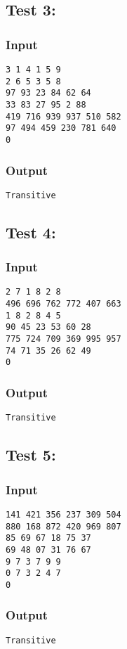 \documentclass[twocolumn]{extarticle}
\begin{document}
\subsection*{Test 3:}
\subsubsection*{Input}
\texttt{3 1 4 1 5 9\\
2 6 5 3 5 8\\
97 93 23 84 62 64\\
33 83 27 95 2 88\\
419 716 939 937 510 582\\
97 494 459 230 781 640\\
0}
 
\subsubsection*{Output}
\texttt{Transitive}
 
\subsection*{Test 4:}
\subsubsection*{Input}
\texttt{2 7 1 8 2 8\\
496 696 762 772 407 663\\
1 8 2 8 4 5\\
90 45 23 53 60 28\\
775 724 709 369 995 957\\
74 71 35 26 62 49\\
0}
 
\subsubsection*{Output}
\texttt{Transitive}
 
\subsection*{Test 5:}
\subsubsection*{Input}
\texttt{141 421 356 237 309 504\\
880 168 872 420 969 807\\
85 69 67 18 75 37\\
69 48 07 31 76 67\\
9 7 3 7 9 9\\
0 7 3 2 4 7\\
0}
 
\subsubsection*{Output}
\texttt{Transitive}
\end{document}
